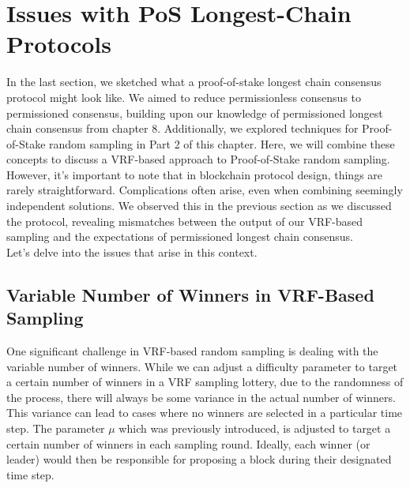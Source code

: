 \section{Issues with PoS Longest-Chain Protocols}
In the last section, we sketched what a proof-of-stake longest chain consensus protocol might look like. We aimed to reduce permissionless consensus to permissioned consensus, building upon our knowledge of permissioned longest chain consensus from chapter 8. Additionally, we explored techniques for Proof-of-Stake random sampling in Part 2 of this chapter. Here, we will combine these concepts to discuss a VRF-based approach to Proof-of-Stake random sampling.\\
However, it's important to note that in blockchain protocol design, things are rarely straightforward. Complications often arise, even when combining seemingly independent solutions. We observed this in the previous section as we discussed the protocol, revealing mismatches between the output of our VRF-based sampling and the expectations of permissioned longest chain consensus.\\
Let's delve into the issues that arise in this context.

\subsection{Variable Number of Winners in VRF-Based Sampling}
One significant challenge in VRF-based random sampling is dealing with the variable number of winners. While we can adjust a difficulty parameter to target a certain number of winners in a VRF sampling lottery, due to the randomness of the process, there will always be some variance in the actual number of winners. This variance can lead to cases where no winners are selected in a particular time step. The parameter $\mu$ which was previously introduced, is adjusted to target a certain number of winners in each sampling round. Ideally, each winner (or leader) would then be responsible for proposing a block during their designated time step.

